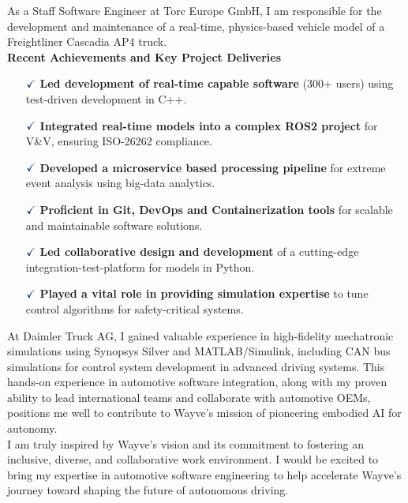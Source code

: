 \documentclass[a4paper,10pt]{article}
\begin{document}
\noindent As a Staff Software Engineer at Torc Europe GmbH, I am responsible
for the development and maintenance of a real-time, physics-based vehicle model
of a Freightliner Cascadia AP4 truck.\\

\noindent \textbf{Recent Achievements and Key Project Deliveries}
\vspace{0.1cm}
\begin{itemize}
    \item[$\textcolor{highlightcolor}{\checkmark}$] \textcolor{highlightcolor}{\textbf{Led development of real-time capable software}} (300+ users) using test-driven development in C++.
    \item[$\textcolor{highlightcolor}{\checkmark}$] \textcolor{highlightcolor}{\textbf{Integrated real-time models into a complex ROS2 project}} for V\&V, ensuring ISO-26262 compliance.
    \item[$\textcolor{highlightcolor}{\checkmark}$] \textcolor{highlightcolor}{\textbf{Developed a microservice based processing pipeline}} for extreme event analysis using big-data analytics.
    \item[$\textcolor{highlightcolor}{\checkmark}$] \textcolor{highlightcolor}{\textbf{Proficient in Git, DevOps and Containerization tools}} for scalable and maintainable software solutions.
    \item[$\textcolor{highlightcolor}{\checkmark}$] \textcolor{highlightcolor}{\textbf{Led collaborative design and development}} of a cutting-edge integration-test-platform for models in Python.
    \item[$\textcolor{highlightcolor}{\checkmark}$] \textcolor{highlightcolor}{\textbf{Played a vital role in providing simulation expertise}} to tune control algorithms for safety-critical systems.
\end{itemize}

\noindent At Daimler Truck AG, I gained valuable experience in high-fidelity
mechatronic simulations using Synopsys Silver and MATLAB/Simulink, including
CAN bus simulations for control system development in advanced driving systems.
This hands-on experience in automotive software integration, along with my
proven ability to lead international teams and collaborate with automotive
OEMs, positions me well to contribute to Wayve's mission of pioneering embodied
AI for autonomy.\\

\noindent I am truly inspired by Wayve’s vision and its commitment to fostering an
inclusive, diverse, and collaborative work environment. I would be excited to
bring my expertise in automotive software engineering to help accelerate
Wayve’s journey toward shaping the future of autonomous driving.\\
\end{document}
